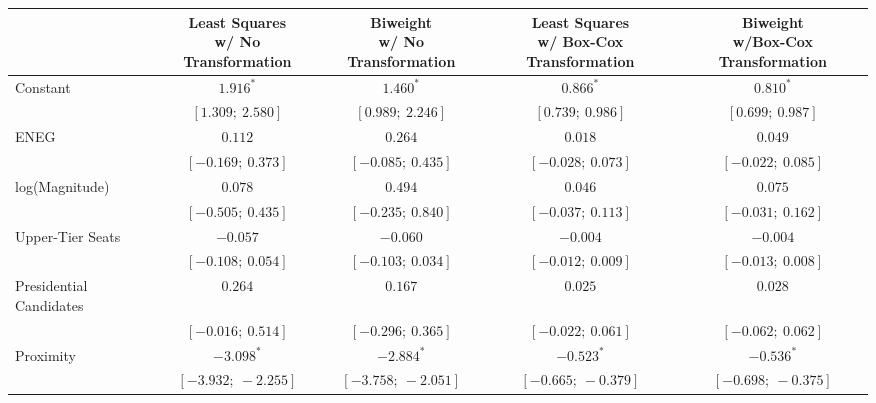 
\begin{tabular}{l c c c c }
\hline
                                           & \specialcell{Least Squares\\w/ No Transformation} & \specialcell{Biweight\\w/ No Transformation} & \specialcell{Least Squares\\w/ Box-Cox Transformation} & \specialcell{Biweight\\w/Box-Cox Transformation} \\
\hline
Constant                                   & $1.916^{*}$         & $1.460^{*}$         & $0.866^{*}$         & $0.810^{*}$         \\
                                           & $[1.309;\ 2.580]$   & $[0.989;\ 2.246]$   & $[0.739;\ 0.986]$   & $[0.699;\ 0.987]$   \\
ENEG                                       & $0.112$             & $0.264$             & $0.018$             & $0.049$             \\
                                           & $[-0.169;\ 0.373]$  & $[-0.085;\ 0.435]$  & $[-0.028;\ 0.073]$  & $[-0.022;\ 0.085]$  \\
log(Magnitude)                             & $0.078$             & $0.494$             & $0.046$             & $0.075$             \\
                                           & $[-0.505;\ 0.435]$  & $[-0.235;\ 0.840]$  & $[-0.037;\ 0.113]$  & $[-0.031;\ 0.162]$  \\
Upper-Tier Seats                           & $-0.057$            & $-0.060$            & $-0.004$            & $-0.004$            \\
                                           & $[-0.108;\ 0.054]$  & $[-0.103;\ 0.034]$  & $[-0.012;\ 0.009]$  & $[-0.013;\ 0.008]$  \\
Presidential Candidates                    & $0.264$             & $0.167$             & $0.025$             & $0.028$             \\
                                           & $[-0.016;\ 0.514]$  & $[-0.296;\ 0.365]$  & $[-0.022;\ 0.061]$  & $[-0.062;\ 0.062]$  \\
Proximity                                  & $-3.098^{*}$        & $-2.884^{*}$        & $-0.523^{*}$        & $-0.536^{*}$        \\
                                           & $[-3.932;\ -2.255]$ & $[-3.758;\ -2.051]$ & $[-0.665;\ -0.379]$ & $[-0.698;\ -0.375]$ \\

\end{tabular}

